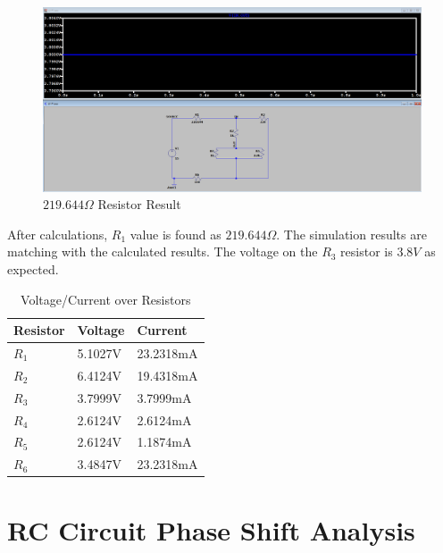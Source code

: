 \begin{figure}[h]
    \centering
    \includegraphics[width=1\textwidth]{assets/p1-res.png}
    \caption{$219.644\Omega$ Resistor Result}
    \label{fig:p1_result}
\end{figure}

After calculations, $R_1$ value is found as $219.644\Omega$. The simulation results are matching with the calculated results. The voltage on the $R_3$ resistor is $3.8V$ as expected.

\begin{table}[h]
    \centering
    \begin{tabular}{|l|l|l|}
        \hline
        \textbf{Resistor} & \textbf{Voltage} & \textbf{Current} \\ \hline
        $R_1$              & 5.1027V          & 23.2318mA        \\ \hline
        $R_2$              & 6.4124V          & 19.4318mA        \\ \hline
        $R_3$              & 3.7999V          & 3.7999mA         \\ \hline
        $R_4$              & 2.6124V          & 2.6124mA         \\ \hline
        $R_5$              & 2.6124V          & 1.1874mA         \\ \hline
        $R_6$              & 3.4847V          & 23.2318mA        \\ \hline
    \end{tabular}
    \caption{Voltage/Current over Resistors}
\end{table}

\newpage
\thispagestyle{plain}

\section{RC Circuit Phase Shift Analysis}

